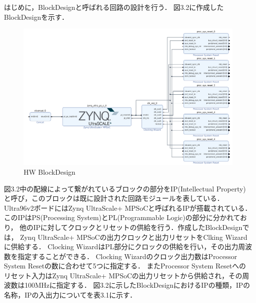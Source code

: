 \documentclass[11pt,a4j]{jreport}
\begin{document}
はじめに，BlockDesignと呼ばれる回路の設計を行う．
図3.2に作成したBlockDesignを示す．
\begin{figure}[H]
  \center
  \includegraphics[scale = 0.4]{pict/pict2.jpg}
  \caption{HW BlockDesign}
\end{figure}
図3.2中の配線によって繋がれているブロックの部分をIP(Intellectual Property)
と呼び，このブロックは既に設計された回路モジュールを表している．
Ultra96v2ボードにはZynq UltraScale+ MPSoCと呼ばれるIPが搭載されている．
このIPはPS(Processing System)とPL(Programmable Logic)の部分に分かれており，
他のIPに対してクロックとリセットの供給を行う．作成したBlockDesignでは，
Zynq UltraScale+ MPSoCの出力クロックと出力リセットをClking Wizardに供給する．
Clocking WizardはPL部分にクロックの供給を行い，その出力周波数を指定することができる．
Clocking Wizardのクロック出力数はProcessor System Resetの数に合わせて5つに指定する．
またProcessor System Resetへのリセット入力はZynq UltraScale+ MPSoCの出力リセットから供給され，その周波数は100MHzに指定する．
図3.2に示したBlockDesignにおけるIPの種類，IPの名称，IPの入出力についてを表3.1に示す．
\end{document}
